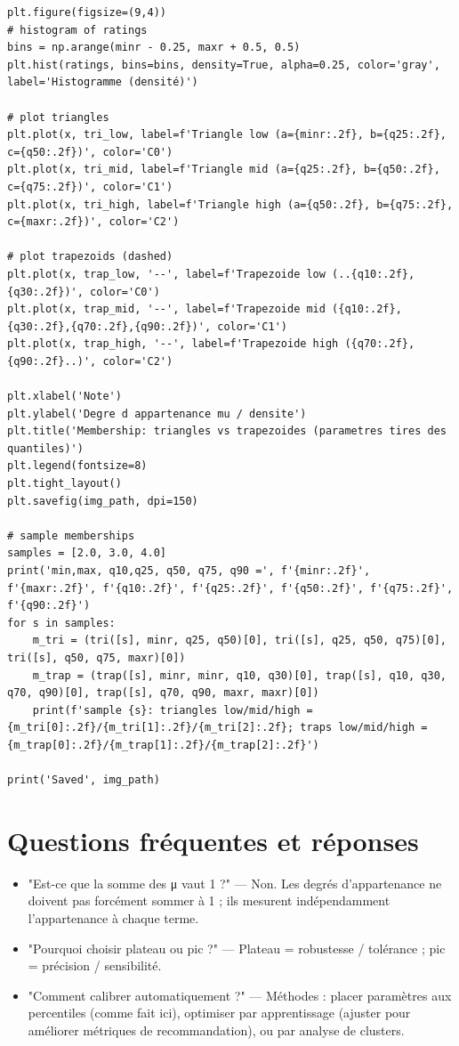 \documentclass[a4paper,11pt]{article}
\begin{document}
\begin{lstlisting}
plt.figure(figsize=(9,4))
# histogram of ratings
bins = np.arange(minr - 0.25, maxr + 0.5, 0.5)
plt.hist(ratings, bins=bins, density=True, alpha=0.25, color='gray', label='Histogramme (densité)')

# plot triangles
plt.plot(x, tri_low, label=f'Triangle low (a={minr:.2f}, b={q25:.2f}, c={q50:.2f})', color='C0')
plt.plot(x, tri_mid, label=f'Triangle mid (a={q25:.2f}, b={q50:.2f}, c={q75:.2f})', color='C1')
plt.plot(x, tri_high, label=f'Triangle high (a={q50:.2f}, b={q75:.2f}, c={maxr:.2f})', color='C2')

# plot trapezoids (dashed)
plt.plot(x, trap_low, '--', label=f'Trapezoide low (..{q10:.2f},{q30:.2f})', color='C0')
plt.plot(x, trap_mid, '--', label=f'Trapezoide mid ({q10:.2f},{q30:.2f},{q70:.2f},{q90:.2f})', color='C1')
plt.plot(x, trap_high, '--', label=f'Trapezoide high ({q70:.2f},{q90:.2f}..)', color='C2')

plt.xlabel('Note')
plt.ylabel('Degre d appartenance mu / densite')
plt.title('Membership: triangles vs trapezoides (parametres tires des quantiles)')
plt.legend(fontsize=8)
plt.tight_layout()
plt.savefig(img_path, dpi=150)

# sample memberships
samples = [2.0, 3.0, 4.0]
print('min,max, q10,q25, q50, q75, q90 =', f'{minr:.2f}', f'{maxr:.2f}', f'{q10:.2f}', f'{q25:.2f}', f'{q50:.2f}', f'{q75:.2f}', f'{q90:.2f}')
for s in samples:
    m_tri = (tri([s], minr, q25, q50)[0], tri([s], q25, q50, q75)[0], tri([s], q50, q75, maxr)[0])
    m_trap = (trap([s], minr, minr, q10, q30)[0], trap([s], q10, q30, q70, q90)[0], trap([s], q70, q90, maxr, maxr)[0])
    print(f'sample {s}: triangles low/mid/high = {m_tri[0]:.2f}/{m_tri[1]:.2f}/{m_tri[2]:.2f}; traps low/mid/high = {m_trap[0]:.2f}/{m_trap[1]:.2f}/{m_trap[2]:.2f}')

print('Saved', img_path)
\end{lstlisting}

\section{Questions fréquentes et réponses}
\begin{itemize}
  \item "Est-ce que la somme des μ vaut 1 ?" — Non. Les degrés d'appartenance ne doivent pas forcément sommer à 1 ; ils mesurent indépendamment l'appartenance à chaque terme.
  \item "Pourquoi choisir plateau ou pic ?" — Plateau = robustesse / tolérance ; pic = précision / sensibilité.
  \item "Comment calibrer automatiquement ?" — Méthodes : placer paramètres aux percentiles (comme fait ici), optimiser par apprentissage (ajuster pour améliorer métriques de recommandation), ou par analyse de clusters.
\end{itemize}
\end{document}
